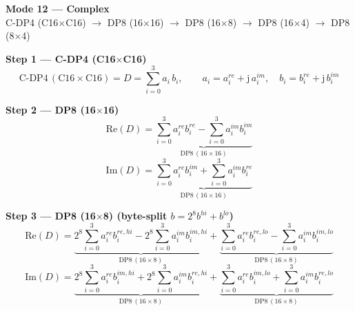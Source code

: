\documentclass[fleqn]{article}
\newcommand{\DPop}[3]{\mathrm{DP#1}\,(#2\!\times\!#3)}
\begin{document}
\begin{center}
{\LARGE \textbf{Mode 12 --- Complex}}\\[4pt]
{\large C-DP4 (C16$\times$C16) $\rightarrow$ DP8 (16$\times$16) $\rightarrow$ DP8 (16$\times$8) $\rightarrow$ DP8 (16$\times$4) $\rightarrow$ DP8 (8$\times$4)}
\end{center}

\vspace{1.5em}

\noindent\textbf{Step 1 --- C-DP4 (C16$\times$C16)}
\[
\text{C-DP4}\,(\mathrm{C16}\!\times\!\mathrm{C16}) = D = \sum_{i=0}^{3} a_i \, b_i, \qquad
a_i = a_i^{re} + \mathrm{j}\,a_i^{im}, \quad
b_i = b_i^{re} + \mathrm{j}\,b_i^{im}
\]

\vspace{0.3em}

\noindent\textbf{Step 2 --- DP8 (16$\times$16)}
\[
\mathrm{Re}(D) = \underbrace{\sum_{i=0}^{3} a_i^{re} b_i^{re}
  - \sum_{i=0}^{3} a_i^{im} b_i^{im}}_{\DPop{8}{16}{16}}
\]
\[
\mathrm{Im}(D) = \underbrace{\sum_{i=0}^{3} a_i^{re} b_i^{im}
  + \sum_{i=0}^{3} a_i^{im} b_i^{re}}_{\DPop{8}{16}{16}}
\]

\vspace{0.3em}

\noindent\textbf{Step 3 --- DP8 (16$\times$8) \quad (byte-split $b = 2^{8} b^{hi} + b^{lo}$)}
\[
\mathrm{Re}(D) = \underbrace{2^{8}\sum_{i=0}^{3} a_i^{re} b_i^{re,hi}
  - 2^{8}\sum_{i=0}^{3} a_i^{im} b_i^{im,hi}}_{\DPop{8}{16}{8}}
  + \underbrace{\sum_{i=0}^{3} a_i^{re} b_i^{re,lo}
  - \sum_{i=0}^{3} a_i^{im} b_i^{im,lo}}_{\DPop{8}{16}{8}}
\]
\[
\mathrm{Im}(D) = \underbrace{2^{8}\sum_{i=0}^{3} a_i^{re} b_i^{im,hi}
  + 2^{8}\sum_{i=0}^{3} a_i^{im} b_i^{re,hi}}_{\DPop{8}{16}{8}}
  + \underbrace{\sum_{i=0}^{3} a_i^{re} b_i^{im,lo}
  + \sum_{i=0}^{3} a_i^{im} b_i^{re,lo}}_{\DPop{8}{16}{8}}
\]

\vspace{0.3em}
\end{document}
